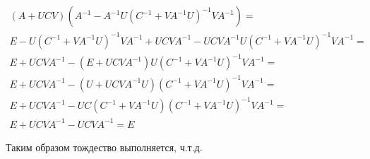 \begin{gather*}
	(A+UCV)(A^{-1}-A^{-1}U(C^{-1}+VA^{-1}U)^{-1}VA^{-1}) = \\
	E - U(C^{-1}+VA^{-1}U)^{-1}VA^{-1} + UCVA^{-1} - UCVA^{-1}U(C^{-1}+VA^{-1}U)^{-1}VA^{-1} = \\
	E + UCVA^{-1} - (E+UCVA^{-1})U(C^{-1}+VA^{-1}U)^{-1}VA^{-1} = \\
	E+UCVA^{-1} - (U+UCVA^{-1}U)(C^{-1}+VA^{-1}U)^{-1}VA^{-1} = \\
	E+UCVA^{-1} - UC(C^{-1}+VA^{-1}U)(C^{-1}+VA^{-1}U)^{-1}VA^{-1} = \\
	E + UCVA^{-1} - UCVA^{-1} = E
\end{gather*} 

Таким образом тождество выполняется, ч.т.д.